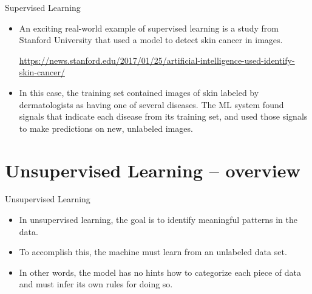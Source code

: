 \documentclass{beamer}
\begin{document}
\begin{frame}{Supervised Learning}

\begin{itemize}

\item An exciting real-world example of supervised learning is a study from Stanford University that used a model to detect skin cancer in images. 

\medskip
\url{https://news.stanford.edu/2017/01/25/artificial-intelligence-used-identify-skin-cancer/}

\item In this case, the training set contained images of skin labeled by dermatologists as having one of several diseases. The ML system found signals that indicate each disease from its training set, and used those signals to make predictions on new, unlabeled images.

\end{itemize}

\end{frame}


\section{Unsupervised Learning -- overview}

\begin{frame}{Unsupervised Learning}

\begin{itemize}

\item In unsupervised learning, the goal is to identify meaningful patterns in the data. 

\item To accomplish this, the machine must learn from an unlabeled data set. 

\item In other words, the model has no hints how to categorize each piece of data and must infer its own rules for doing so.

\end{itemize}

\end{frame}

\end{document}
